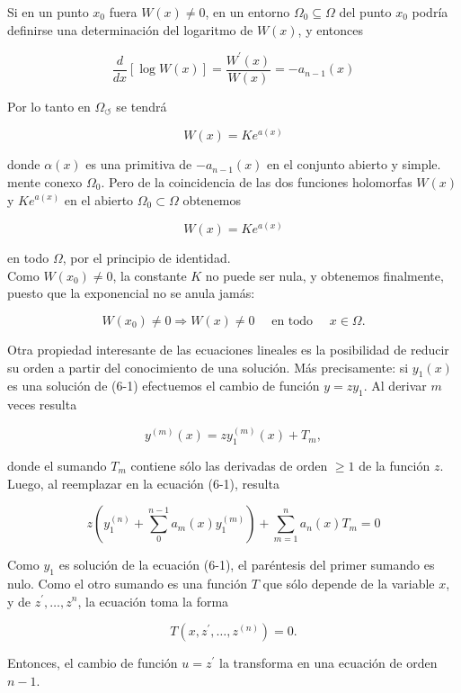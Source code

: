 \documentclass[10pt]{article}
\theoremstyle{plain}
\theoremstyle{definition}
\theoremstyle{remark}
\begin{document}
Si en un punto $x_{0}$ fuera $W(x) \neq 0$, en un entorno $\Omega_{0} \subseteq \Omega$ del punto $x_{0}$ podría definirse una determinación del logaritmo de $W(x)$, y entonces

$$
\frac{d}{d x}[\log W(x)]=\frac{W^{\prime}(x)}{W(x)}=-a_{n-1}(x)
$$

Por lo tanto en $\Omega_{\circlearrowleft}$ se tendrá


\begin{equation*}
W(x)=K e^{a(x)} \tag{6-6}
\end{equation*}



donde $\alpha(x)$ es una primitiva de $-a_{n-1}(x)$ en el conjunto abierto y simple. mente conexo $\Omega_{0}$. Pero de la coincidencia de las dos funciones holomorfas $W(x)$ y $K e^{a(x)}$ en el abierto $\Omega_{0} \subset \Omega$ obtenemos

$$
W(x)=K e^{a(x)}
$$

en todo $\Omega$, por el principio de identidad.\\
Como $W\left(x_{0}\right) \neq 0$, la constante $K$ no puede ser nula, y obtenemos finalmente, puesto que la exponencial no se anula jamás:

$$
W\left(x_{0}\right) \neq 0 \Rightarrow W(x) \neq 0 \quad \text { en todo } \quad x \in \Omega .
$$

Otra propiedad interesante de las ecuaciones lineales es la posibilidad de reducir su orden a partir del conocimiento de una solución. Más precisamente: si $y_{1}(x)$ es una solución de (6-1) efectuemos el cambio de función $y=z y_{1}$. Al derivar $m$ veces resulta

$$
y^{(m)}(x)=z y_{1}^{(m)}(x)+T_{m},
$$

donde el sumando $T_{m}$ contiene sólo las derivadas de orden $\geqslant 1$ de la función $z$. Luego, al reemplazar en la ecuación (6-1), resulta

$$
z\left(y_{1}^{(n)}+\sum_{0}^{n-1} a_{m}(x) y_{1}^{(m)}\right)+\sum_{m=1}^{n} a_{n}(x) T_{m}=0
$$

Como $y_{1}$ es solución de la ecuación (6-1), el paréntesis del primer sumando es nulo. Como el otro sumando es una función $T$ que sólo depende de la variable $x$, y de $z^{\prime}, \ldots, z^{n}$, la ecuación toma la forma

$$
T\left(x, z^{\prime}, \ldots, z^{(n)}\right)=0 .
$$

Entonces, el cambio de función $u=z^{\prime}$ la transforma en una ecuación de orden $n-1$.
\end{document}

